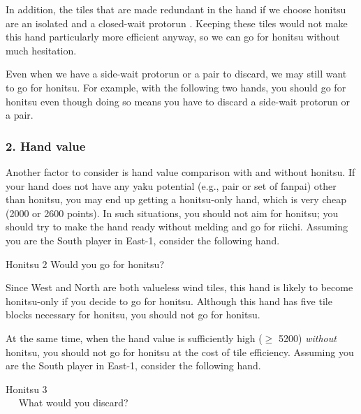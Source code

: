 \bigskip
In addition, the tiles that are made redundant in the hand if we choose {\jap honitsu} are an isolated {\LARGE{}} and a closed-wait protorun {\LARGE{}}. Keeping these tiles would not make this hand particularly more efficient anyway, so we can go for {\jap honitsu} without much hesitation. 

\bigskip
Even when we have a side-wait protorun or a pair to discard, we may still want to go for {\jap honitsu}. For example, with the following two hands, you should go for {\jap honitsu} even though doing so means you have to discard a side-wait protorun or a pair. 
\bp
{}\xi\bai\bai\bai\\
\dong\nan\nan\bei\zhong
\ep

\subsubsection{2. Hand value}

Another factor to consider is hand value comparison with and without {\jap honitsu}. If your hand does not have any {\jap yaku} potential (e.g., pair or set of {\jap fanpai}) other than {\jap honitsu}, you may end up getting a {\jap honitsu}-only hand, which is very cheap (2000 or 2600 points). In such situations, you should not aim for {\jap honitsu}; you should try to make the hand ready without melding and go for riichi. Assuming you are the South player in East-1, consider the following hand.
\begin{itembox}[r]{{\jap Honitsu} 2}
\bp
{}\xi\xi\bei\bei
\ep
\vspace{-10pt}Would you go for {\jap honitsu}? \vspace{-5pt}
\end{itembox}
\noindent
Since West and North are both valueless wind tiles, this hand is likely to become {\jap honitsu}-only if you decide to go for {\jap honitsu}. Although this hand has five tile blocks necessary for {\jap honitsu}, you should not go for {\jap honitsu}. 

\bigskip
At the same time, when the hand value is sufficiently high ($\geq$ 5200) \emph{without} {\jap honitsu}, you should not go for {\jap honitsu} at the cost of tile efficiency. Assuming you are the South player in East-1, consider the following hand.
\begin{itembox}[r]{{\jap Honitsu} 3}
\bp \vspace{-10pt}
\\ \vspace{-16pt}
\rfw{}\fa\fa\fa\xi~~\nan\nan\rnan
\ep
\vspace{-10pt}What would you discard? \vspace{-5pt}
\end{itembox}

